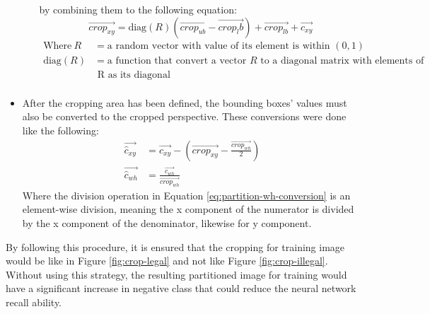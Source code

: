 \begin{itemize}[topsep=0pt]
\begin{itemize}
    by combining them to the following equation:
    \begin{equation}
      \overrightarrow{crop_{xy}} = \text{diag}(R)(\overrightarrow{crop_{ub}} - \overrightarrow{crop_lb}) + \overrightarrow{crop_{lb}} + \overrightarrow{c_{xy}}
    \end{equation}
    \begin{align*}
      \text{Where}~R &= \text{a random vector with value of its element is within $(0,1)$}\\
      \text{diag}(R) &= \text{a function that convert a vector $R$ to a diagonal matrix with elements of}\\ &\text{ R as its diagonal}\\
    \end{align*}
  \end{itemize}
  \item After the cropping area has been defined, the bounding boxes' values must also be converted to the cropped perspective.
  These conversions were done like the following:
  \begin{align}
    \overrightarrow{\hat{c}_{xy}} &= \overrightarrow{c_{xy}} - (\overrightarrow{crop_{xy}} - \frac{\overrightarrow{crop_{wh}}}{2})\\
    \overrightarrow{\hat{c}_{wh}} &= \frac{\overrightarrow{c_{wh}}}{\overrightarrow{crop_{wh}}} \label{eq:partition-wh-conversion}
  \end{align}
  Where the division operation in Equation \ref{eq:partition-wh-conversion} is an element-wise division, meaning the x component of the numerator is divided by the x component of the denominator, likewise for y component.
\end{itemize}
By following this procedure, it is ensured that the cropping for training image would be like in Figure \ref{fig:crop-legal} and not like Figure \ref{fig:crop-illegal}.
Without using this strategy, the resulting partitioned image for training would have a significant increase in negative class that could reduce the neural network recall ability.

